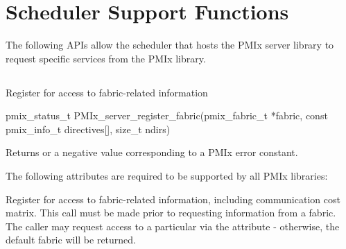 %

\section{Scheduler Support Functions}

The following \acp{API} allow the scheduler that hosts the \ac{PMIx} server library to request specific services from the \ac{PMIx} library.

\subsection{}

\summary

Register for access to fabric-related information

\format

\cspecificstart
\begin{codepar}
pmix_status_t
PMIx_server_register_fabric(pmix_fabric_t *fabric,
                            const pmix_info_t directives[],
                            size_t ndirs)
\end{codepar}
\cspecificend

\begin{arglist}
\end{arglist}

Returns  or a negative value corresponding to a \ac{PMIx} error constant.

\reqattrstart
The following attributes are required to be supported by all \ac{PMIx} libraries:


\reqattrend

\descr

Register for access to fabric-related information, including communication cost matrix. This call must be made prior to requesting information from a fabric. The caller may request access to a particular  via the  attribute - otherwise, the default fabric will be returned.

